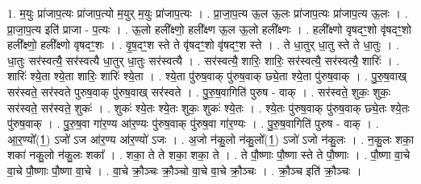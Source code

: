 \documentclass[17pt]{extarticle}
\begin{document}
1. म॒युः प्रा॑जाप॒त्यः प्रा॑जाप॒त्यो म॒युर् म॒युः प्रा॑जाप॒त्यः । . प्रा॒जा॒प॒त्य ऊ॒ल ऊ॒लः प्रा॑जाप॒त्यः प्रा॑जाप॒त्य ऊ॒लः । . प्रा॒जा॒प॒त्य इति॑ प्राजा - प॒त्यः । . ऊ॒लो हली᳚क्ष्णो॒ हली᳚क्ष्ण ऊ॒ल ऊ॒लो हली᳚क्ष्णः । . हली᳚क्ष्णो वृषदꣳ॒॒शो वृ॑षदꣳ॒॒शो हली᳚क्ष्णो॒ हली᳚क्ष्णो वृषदꣳ॒॒शः । . वृ॒ष॒दꣳ॒॒श स्ते ते वृ॑षदꣳ॒॒शो वृ॑षदꣳ॒॒श स्ते । . ते धा॒तुर् धा॒तु स्ते ते धा॒तुः । . धा॒तुः सर॑स्वत्यै॒ सर॑स्वत्यै धा॒तुर् धा॒तुः सर॑स्वत्यै । . सर॑स्वत्यै॒ शारिः॒ शारिः॒ सर॑स्वत्यै॒ सर॑स्वत्यै॒ शारिः॑ । . शारिः॑ श्ये॒ता श्ये॒ता शारिः॒ शारिः॑ श्ये॒ता । . श्ये॒ता पु॑रुष॒वाक् पु॑रुष॒वाक् छ्ये॒ता श्ये॒ता पु॑रुष॒वाक् । . पु॒रु॒ष॒वाख् सर॑स्वते॒ सर॑स्वते पुरुष॒वाक् पु॑रुष॒वाख् सर॑स्वते । . पु॒रु॒ष॒वागिति॑ पुरुष - वाक् । . सर॑स्वते॒ शुकः॒ शुकः॒ सर॑स्वते॒ सर॑स्वते॒ शुकः॑ । . शुकः॑ श्ये॒तः श्ये॒तः शुकः॒ शुकः॑ श्ये॒तः । . श्ये॒तः पु॑रुष॒वाक् पु॑रुष॒वाक् छ्ये॒तः श्ये॒तः पु॑रुष॒वाक् । . पु॒रु॒ष॒वा गा॑र॒ण्य आ॑र॒ण्यः पु॑रुष॒वाक् पु॑रुष॒वा गा॑र॒ण्यः । . पु॒रु॒ष॒वागिति॑ पुरुष - वाक् । . आ॒र॒ण्यो᳚(1॒) ऽजो॑ ऽज आ॑र॒ण्य आ॑र॒ण्यो॑ ऽजः । . अ॒जो न॑कु॒लो न॑कु॒लो᳚(1॒) ऽजो॑ ऽजो न॑कु॒लः । . न॒कु॒लः शका॒ शका॑ नकु॒लो न॑कु॒लः शका᳚ । . शका॒ ते ते शका॒ शका॒ ते । . ते पौ॒ष्णाः पौ॒ष्णा स्ते ते पौ॒ष्णाः । . पौ॒ष्णा वा॒चे वा॒चे पौ॒ष्णाः पौ॒ष्णा वा॒चे । . वा॒चे क्रौ॒ञ्चः क्रौ॒ञ्चो वा॒चे वा॒चे क्रौ॒ञ्चः । . क्रौ॒ञ्च इति॑ क्रौ॒ञ्चः । \newline
\end{document}
